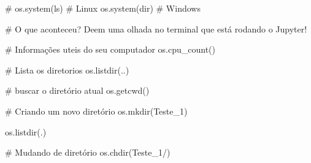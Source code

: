 \documentclass[
  letterpaper,
  DIV=11,
  numbers=noendperiod]{scrreprt}
\newenvironment{Shaded}{\begin{snugshade}}{\end{snugshade}}
\newcommand{\NormalTok}[1]{\textcolor[rgb]{0.00,0.23,0.31}{#1}}
\begin{document}
\begin{Shaded}
\begin{Highlighting}[]
\NormalTok{\# os.system(\textquotesingle{}ls\textquotesingle{}) \# Linux}
\NormalTok{os.system(\textquotesingle{}dir\textquotesingle{}) \# Windows }

\NormalTok{\# O que aconteceu? Deem uma olhada no terminal que está rodando o Jupyter!}
\end{Highlighting}
\end{Shaded}

\begin{Shaded}
\begin{Highlighting}[]
\NormalTok{\# Informações uteis do seu computador }
\NormalTok{os.cpu\_count()}
\end{Highlighting}
\end{Shaded}

\begin{Shaded}
\begin{Highlighting}[]
\NormalTok{\# Lista os diretorios}
\NormalTok{os.listdir(\textquotesingle{}..\textquotesingle{})}
\end{Highlighting}
\end{Shaded}

\begin{Shaded}
\begin{Highlighting}[]
\NormalTok{\# buscar o diretório atual}
\NormalTok{os.getcwd()}
\end{Highlighting}
\end{Shaded}

\begin{Shaded}
\begin{Highlighting}[]
\NormalTok{\# Criando um novo diretório}
\NormalTok{os.mkdir(\textquotesingle{}Teste\_1\textquotesingle{})}
\end{Highlighting}
\end{Shaded}

\begin{Shaded}
\begin{Highlighting}[]
\NormalTok{os.listdir(\textquotesingle{}.\textquotesingle{})}
\end{Highlighting}
\end{Shaded}

\begin{Shaded}
\begin{Highlighting}[]
\NormalTok{\# Mudando de diretório}
\NormalTok{os.chdir(\textquotesingle{}Teste\_1/\textquotesingle{})}
\end{Highlighting}
\end{Shaded}
\end{document}
